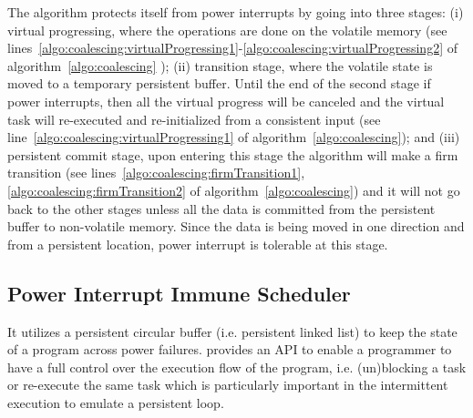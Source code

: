 The algorithm protects itself from power interrupts by going into three stages: (i) virtual progressing, where the operations are done on the volatile memory (see lines~\ref{algo:coalescing:virtualProgressing1}-\ref{algo:coalescing:virtualProgressing2} of algorithm~\ref{algo:coalescing} ); (ii) transition stage, where the volatile state is moved to a temporary persistent buffer. Until the end of the second stage if power interrupts, then all the virtual progress will be canceled and the virtual task will re-executed and re-initialized from a consistent input (see line~\ref{algo:coalescing:virtualProgressing1} of algorithm~\ref{algo:coalescing}); and (iii) persistent commit stage, upon entering this stage the algorithm will make a firm transition (see lines~\ref{algo:coalescing:firmTransition1},\ref{algo:coalescing:firmTransition2} of algorithm~\ref{algo:coalescing}) and it will not go back to the other stages unless all the data is committed from  the persistent buffer to non-volatile memory. Since the data is being moved in one direction and from a persistent location, power interrupt is tolerable at this stage. 

\subsection{Power Interrupt Immune Scheduler}


It utilizes a persistent circular buffer (i.e. persistent linked list) to keep the state of a program across power failures. \sys provides an API to enable a programmer to have a full control over the execution flow of the program, i.e. (un)blocking a task or re-execute the same task which is particularly important in the intermittent execution to emulate a persistent loop. 

%		
%		
